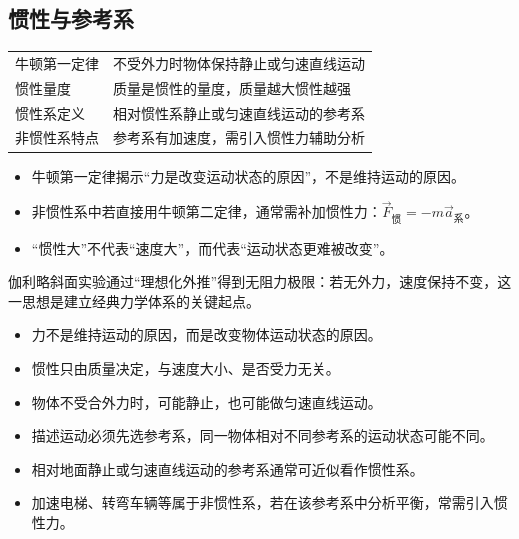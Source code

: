 \subsection{惯性与参考系}
\begin{tabularx}{\columnwidth}{XX}
  牛顿第一定律 & 不受外力时物体保持静止或匀速直线运动 \\
  惯性量度 & 质量是惯性的量度，质量越大惯性越强 \\
  惯性系定义 & 相对惯性系静止或匀速直线运动的参考系 \\
  非惯性系特点 & 参考系有加速度，需引入惯性力辅助分析 \\
\end{tabularx}

\begin{formulanotebox}
\begin{itemize}[leftmargin=1.5em]
  \item 牛顿第一定律揭示“力是改变运动状态的原因”，不是维持运动的原因。
  \item 非惯性系中若直接用牛顿第二定律，通常需补加惯性力：$\vec F_\text{惯}=-m\vec a_\text{系}$。
  \item “惯性大”不代表“速度大”，而代表“运动状态更难被改变”。
\end{itemize}
\end{formulanotebox}

\begin{keypointbox}
伽利略斜面实验通过“理想化外推”得到无阻力极限：若无外力，速度保持不变，这一思想是建立经典力学体系的关键起点。
\end{keypointbox}

\begin{casetypebox}[title={\strut\textcolor{white}{\bfseries 常见题型：惯性定律理解辨析}}]
\begin{itemize}[leftmargin=1.5em]
  \item 力不是维持运动的原因，而是改变物体运动状态的原因。
  \item 惯性只由质量决定，与速度大小、是否受力无关。
  \item 物体不受合外力时，可能静止，也可能做匀速直线运动。
\end{itemize}
\end{casetypebox}

\begin{casetypebox}[title={\strut\textcolor{white}{\bfseries 常见题型：参考系选择}}]
\begin{itemize}[leftmargin=1.5em]
  \item 描述运动必须先选参考系，同一物体相对不同参考系的运动状态可能不同。
  \item 相对地面静止或匀速直线运动的参考系通常可近似看作惯性系。
  \item 加速电梯、转弯车辆等属于非惯性系，若在该参考系中分析平衡，常需引入惯性力。
\end{itemize}
\end{casetypebox}
